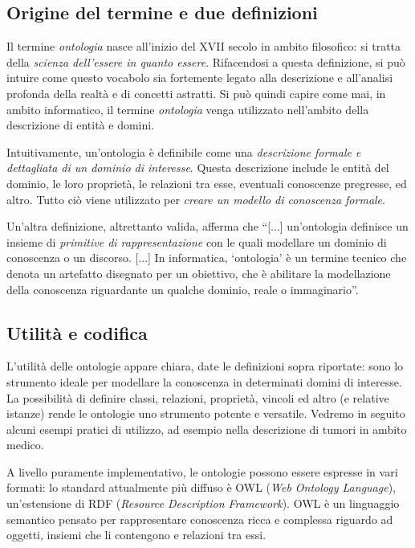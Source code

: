 \subsection{Origine del termine e due definizioni}
Il termine \textit{ontologia} nasce all'inizio del XVII secolo in ambito filosofico: si tratta della \textit{scienza dell'essere in quanto essere}\cite{treccani_ontologia}. Rifacendosi a questa definizione, si può intuire come questo vocabolo sia fortemente legato alla descrizione e all'analisi profonda della realtà e di concetti astratti. Si può quindi capire come mai, in ambito informatico, il termine \textit{ontologia} venga utilizzato nell'ambito della descrizione di entità e domini.

Intuitivamente, un'ontologia è definibile come una \textit{descrizione formale e dettagliata di un dominio di interesse}. Questa descrizione include le entità del dominio, le loro proprietà, le relazioni tra esse, eventuali conoscenze pregresse, ed altro. Tutto ciò viene utilizzato per \textit{creare un modello di conoscenza formale}\cite{fenz2012}.

Un'altra definizione, altrettanto valida, afferma che ``[...] un'ontologia definisce un insieme di \textit{primitive di rappresentazione} con le quali modellare un dominio di conoscenza o un discorso. [...] In informatica, `ontologia' è un termine tecnico che denota un artefatto disegnato per un obiettivo, che è abilitare la modellazione della conoscenza riguardante un qualche dominio, reale o immaginario''\cite{tomgruber_ontology}.


\subsection{Utilità e codifica}
L'utilità delle ontologie appare chiara, date le definizioni sopra riportate: sono lo strumento ideale per modellare la conoscenza in determinati domini di interesse. La possibilità di definire classi, relazioni, proprietà, vincoli ed altro (e relative istanze) rende le ontologie uno strumento potente e versatile. Vedremo in seguito alcuni esempi pratici di utilizzo, ad esempio nella descrizione di tumori in ambito medico.

A livello puramente implementativo, le ontologie possono essere espresse in vari formati: lo standard attualmente più diffuso è OWL (\textit{Web Ontology Language}), un'estensione di RDF (\textit{Resource Description Framework})\cite{rdf}. OWL è un linguaggio semantico pensato per rappresentare conoscenza ricca e complessa riguardo ad oggetti, insiemi che li contengono e relazioni tra essi\cite{w3c_owl}.


